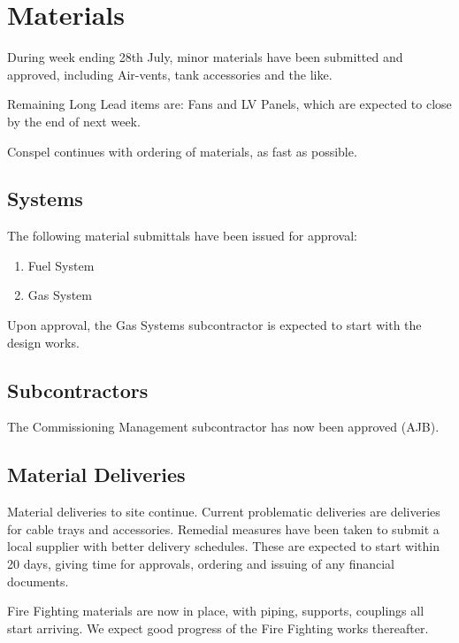 \chapter{Materials}

During week ending 28th July, minor materials have been submitted and approved, including
Air-vents, tank accessories and the like.

Remaining Long Lead items are: Fans and LV Panels, which are expected to close by the end of next week.

Conspel continues with ordering of materials, as fast as possible. 

\section{Systems}

The following material submittals have been issued for approval:

\begin{enumerate}
\item  Fuel System
\item Gas System
\end{enumerate}

Upon approval, the Gas Systems subcontractor is expected to start with the design works.

\section{Subcontractors}

The Commissioning Management subcontractor has now been approved (AJB).

\section{Material Deliveries}

Material deliveries to site continue. Current problematic deliveries are deliveries for cable trays and accessories. Remedial measures have been
taken to submit a local supplier with better delivery schedules. These are expected to start within 20 days, giving time for approvals, ordering
and issuing of any financial documents.

Fire Fighting materials are now in place, with piping, supports, couplings all start arriving. We expect good progress of the Fire Fighting works
thereafter.
